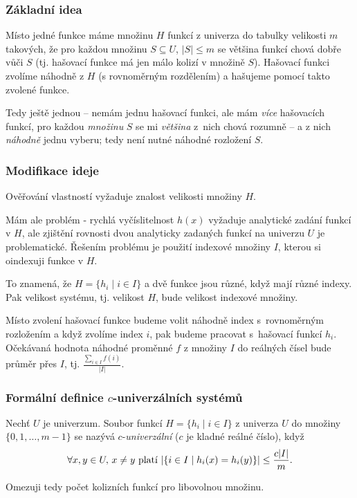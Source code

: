 \documentclass[a4paper,12pt]{article}
\begin{document}
\subsubsection{Základní idea}

Místo jedné funkce máme 
množinu $H$ funkcí z univerza do tabulky velikosti $m$ 
takových, že pro každou množinu $S\subseteq U$, $|S|\le 
m$ se 
většina funkcí chová dobře vůči $S$ (tj. hašovací funkce má jen málo kolizí v množině $S$). 
Hašovací funkci 
zvolíme náhodně z $H$ (s rovnoměrným rozdělením) a hašujeme  
pomocí takto zvo\-lené funkce. 

Tedy ještě jednou -- nemám jednu hašovací funkci, ale mám \emph{více} hašovacích funkcí, pro každou \emph{množinu} $S$ se mi \emph{většina} z~nich chová rozumně -- a z nich \emph{náhodně} jednu vyberu; tedy není nutné náhodné rozložení $S$.

\subsubsection{Modifikace ideje}
Ověřování vlastností vyžaduje 
znalost velikosti množiny $H$.

Mám ale problém - rychlá vyčíslitelnost $
h(x)$ 
vyžaduje ana\-lytické zadání funkcí v $H$, ale zjištění rovnosti 
dvou analy\-ticky zadaných funkcí na univerzu $U$ je 
problematické. Řešením problému je použití indexové množiny $I$, kterou si oindexuji funkce v $H$. 

To znamená, že $H=\{h_i\mid i\in I\}$ a dvě funkce jsou různé, 
když mají různé indexy. Pak velikost systému, tj. velikost $H$, bude 
velikost indexové množiny. 

Místo zvolení hašovací funkce 
budeme volit náhodně index s~rovnoměrným rozložením a když 
zvolíme index $i$, pak budeme pracovat s~hašovací funkcí $
h_i$. 
Očekávaná hodnota náhodné proměnné $f$ z množiny $
I$ do 
reálných čísel bude průměr přes $I$, tj. $\frac {
\sum_{i\in I}f(i)}{|I|}$.

\subsubsection{Formální definice $c$-univerzálních systémů}
Nechť  $U$ je univerzum. Soubor  
funkcí $H=\{h_i\mid i\in I\}$ z univerza $U$ do množiny $\{
0,1,\dots,m-1\}$ se 
nazývá $c$-\emph{univerzální} ($c$ je kladné reálné číslo), 
když 
$$\forall x,y\in U,\,x\ne y\text{\rm\ platí }|\{i\in I\mid h_
i(x)=h_i(y)\}|\le\frac {c|I|}m.$$

Omezuji tedy počet kolizních funkcí pro libovolnou množinu.
\end{document}
